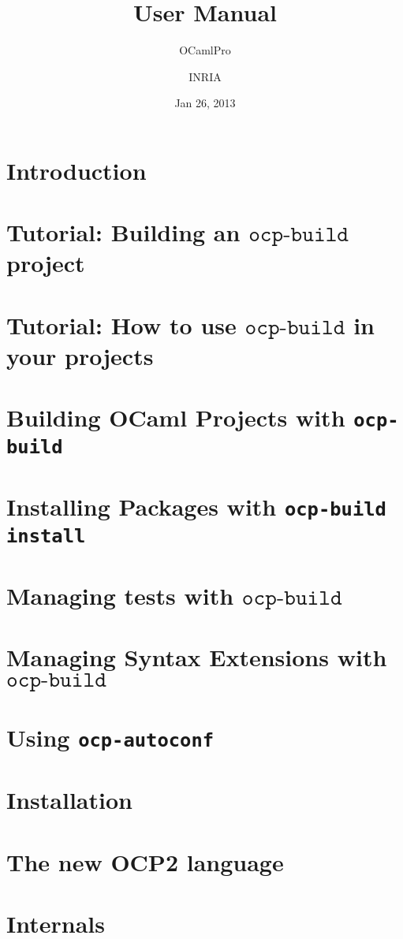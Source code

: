 \documentclass[11pt]{book}
\title{\ocpbuild{} User Manual}
\author{OCamlPro \and INRIA}
\date{Jan 26, 2013}
\newcommand{\cmd}[1]{$\texttt{#1}$}
\newcommand{\ocpbuild}{\cmd{ocp-build}}
\begin{document}
\maketitle
\thispagestyle{empty}
\tableofcontents

\chapter{Introduction}


\chapter{Tutorial: Building an \ocpbuild{} project}


\chapter{Tutorial: How to use \ocpbuild{} in your projects}


\chapter{Building OCaml Projects with {\tt ocp-build}}


\chapter{Installing Packages with {\tt ocp-build install}}


\chapter{Managing tests with \ocpbuild{}}


\chapter{Managing Syntax Extensions with \ocpbuild{}}



\chapter{Using {\tt ocp-autoconf}}


\chapter{Installation}


\chapter{The new OCP2 language}


\chapter{Internals}


%
\end{document}

